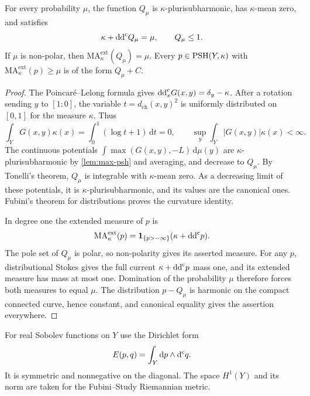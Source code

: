 \begin{lemma}\label{lem:curve-probability-green-potential}
For every probability $\mu$, the function $Q_\mu$ is $\kappa$-plurisubharmonic, has $\kappa$-mean zero, and satisfies
\[
 \kappa+\mathrm{dd}^{\mathrm{c}} Q_\mu=\mu,\qquad Q_\mu\leq1.
\]
If $\mu$ is non-polar, then $\mathrm{MA}^{\mathrm{ext}}_\kappa(Q_\mu)=\mu$. Every $p\in\mathrm{PSH}(Y,\kappa)$ with $\mathrm{MA}^{\mathrm{ext}}_\kappa(p)\geq\mu$ is of the form $Q_\mu+C$.
\end{lemma}
\begin{proof}
The Poincar\'e--Lelong formula gives $\mathrm{dd}^{\mathrm{c}}_xG(x,y)=\delta_y-\kappa$. After a rotation sending $y$ to $[1:0]$, the variable $t=d_{\mathrm{ch}}(x,y)^2$ is uniformly distributed on $[0,1]$ for the measure $\kappa$. Thus
\[
 \int_YG(x,y)\kappa(x)=\int_0^1(\log t+1)\,\mathrm dt=0,
 \qquad \sup_y\int_Y|G(x,y)|\kappa(x)<\infty.
\]
The continuous potentials $\int\max(G(x,y),-L)\,\mathrm d\mu(y)$ are $\kappa$-plurisubharmonic by \cref{lem:max-psh} and averaging, and decrease to $Q_\mu$. By Tonelli's theorem, $Q_\mu$ is integrable with $\kappa$-mean zero. As a decreasing limit of these potentials, it is $\kappa$-plurisubharmonic, and its values are the canonical ones. Fubini's theorem for distributions proves the curvature identity.

In degree one the extended measure of $p$ is
\[
 \mathrm{MA}^{\mathrm{ext}}_\kappa(p)
 =\mathbf1_{\{p>-\infty\}}(\kappa+\mathrm{dd}^{\mathrm{c}} p).
\]
The pole set of $Q_\mu$ is polar, so non-polarity gives its asserted measure. For any $p$, distributional Stokes gives the full current $\kappa+\mathrm{dd}^{\mathrm{c}} p$ mass one, and its extended measure has mass at most one. Domination of the probability $\mu$ therefore forces both measures to equal $\mu$. The distribution $p-Q_\mu$ is harmonic on the compact connected curve, hence constant, and canonical equality gives the assertion everywhere.
\end{proof}

For real Sobolev functions on $Y$ use the Dirichlet form
\[
 E(p,q)=\int_Y\mathrm dp\wedge\mathrm d^{\mathrm c} q.
\]
It is symmetric and nonnegative on the diagonal. The space $H^1(Y)$ and its norm are taken for the Fubini--Study Riemannian metric.

